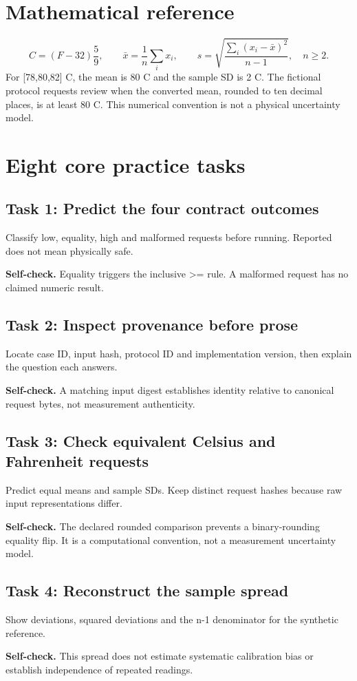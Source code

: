 \section{Mathematical reference}\[C=(F-32)\frac59,\qquad \bar{x}=\frac1n\sum_i x_i,\qquad s=\sqrt{\frac{\sum_i(x_i-\bar{x})^2}{n-1}},\quad n\geq2.\]For [78,80,82] C, the mean is 80 C and the sample SD is 2 C. The fictional protocol requests review when the converted mean, rounded to ten decimal places, is at least 80 C. This numerical convention is not a physical uncertainty model.
\section{Eight core practice tasks}
\subsection{Task 1: Predict the four contract outcomes}
Classify low, equality, high and malformed requests before running. Reported does not mean physically safe.

\textbf{Self-check.} Equality triggers the inclusive >= rule. A malformed request has no claimed numeric result.
\subsection{Task 2: Inspect provenance before prose}
Locate case ID, input hash, protocol ID and implementation version, then explain the question each answers.

\textbf{Self-check.} A matching input digest establishes identity relative to canonical request bytes, not measurement authenticity.
\subsection{Task 3: Check equivalent Celsius and Fahrenheit requests}
Predict equal means and sample SDs. Keep distinct request hashes because raw input representations differ.

\textbf{Self-check.} The declared rounded comparison prevents a binary-rounding equality flip. It is a computational convention, not a measurement uncertainty model.
\subsection{Task 4: Reconstruct the sample spread}
Show deviations, squared deviations and the n-1 denominator for the synthetic reference.

\textbf{Self-check.} This spread does not estimate systematic calibration bias or establish independence of repeated readings.
